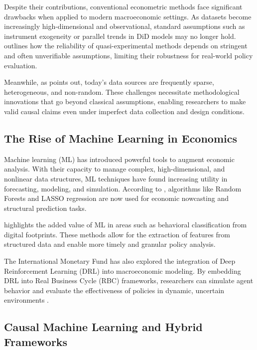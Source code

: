 Despite their contributions, conventional econometric methods face significant drawbacks when applied to modern macroeconomic settings. As datasets become increasingly high-dimensional and observational, standard assumptions such as instrument exogeneity or parallel trends in DiD models may no longer hold. \citet{policy2020hal} outlines how the reliability of quasi-experimental methods depends on stringent and often unverifiable assumptions, limiting their robustness for real-world policy evaluation.

Meanwhile, as \citet{bareinboim2023fusion} points out, today's data sources are frequently sparse, heterogeneous, and non-random. These challenges necessitate methodological innovations that go beyond classical assumptions, enabling researchers to make valid causal claims even under imperfect data collection and design conditions.

\subsection{The Rise of Machine Learning in Economics}\label{subsec:ml_economics}

Machine learning (ML) has introduced powerful tools to augment economic analysis. With their capacity to manage complex, high-dimensional, and nonlinear data structures, ML techniques have found increasing utility in forecasting, modeling, and simulation. According to \citet{bankofcanada2023ml}, algorithms like Random Forests and LASSO regression are now used for economic nowcasting and structural prediction tasks.

\citet{sekhansen2023mlpolicy} highlights the added value of ML in areas such as behavioral classification from digital footprints. These methods allow for the extraction of features from structured data and enable more timely and granular policy analysis.

The International Monetary Fund has also explored the integration of Deep Reinforcement Learning (DRL) into macroeconomic modeling. By embedding DRL into Real Business Cycle (RBC) frameworks, researchers can simulate agent behavior and evaluate the effectiveness of policies in dynamic, uncertain environments \citep{imf2023ai}.

\subsection{Causal Machine Learning and Hybrid Frameworks}\label{subsec:cml_hybrid}

